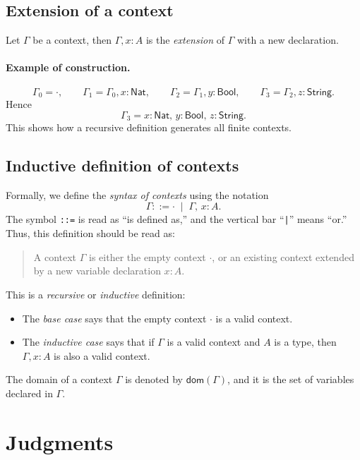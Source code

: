 \documentclass{article}
\newcommand{\Nat}{\mathsf{Nat}}
\newcommand{\Bool}{\mathsf{Bool}}
\newcommand{\String}{\mathsf{String}}
\newcommand{\emptyctx}{\cdot}              %
\newcommand{\dom}{\mathsf{dom}}            %
\begin{document}
\subsection*{Extension of a context}
Let $\Gamma$ be a context, then \(\Gamma, x : A\) is the \emph{extension} of \(\Gamma\) with a new declaration.

\paragraph{Example of construction.}
\[
\Gamma_0 = \emptyctx, \qquad
\Gamma_1 = \Gamma_0, x : \Nat, \qquad
\Gamma_2 = \Gamma_1, y : \Bool, \qquad
\Gamma_3 = \Gamma_2, z : \String.
\]
Hence
\[
\Gamma_3 = x : \Nat,\, y : \Bool,\, z : \String.
\]
This shows how a recursive definition generates all finite contexts.

\subsection*{Inductive definition of contexts}

Formally, we define the \emph{syntax of contexts} using the notation
\[
\Gamma ::= \emptyctx \;\mid\; \Gamma,\, x : A.
\]
The symbol \texttt{::=} is read as “is defined as,” and the vertical bar “\texttt{|}” means “or.”  
Thus, this definition should be read as:

\begin{quote}
A context \(\Gamma\) is either the empty context \(\emptyctx\),  
or an existing context extended by a new variable declaration \(x : A\).
\end{quote}

This is a \emph{recursive} or \emph{inductive} definition:  
\begin{itemize}
  \item The \emph{base case} says that the empty context \(\emptyctx\) is a valid context.
  \item The \emph{inductive case} says that if \(\Gamma\) is a valid context and \(A\) is a type, then \(\Gamma, x : A\) is also a valid context.
\end{itemize}

The domain of a context $\Gamma$ is denoted by \(\dom(\Gamma)\), and it is the set of variables declared in \(\Gamma\).

\section{Judgments}
\end{document}
